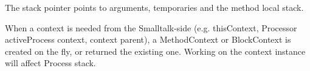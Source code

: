 The stack pointer points to arguments, temporaries and the method local stack.

When a context is needed from the Smalltalk-side (e.g. thisContext, Processor activeProcess context, context parent), a MethodContext or BlockContext is created on the fly, or returned the existing one. Working on the context instance will affect Process stack. 